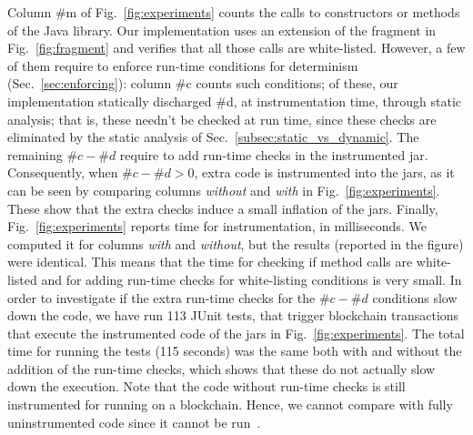 Column \#m of Fig.~\ref{fig:experiments} counts the calls to constructors
or methods of the Java library. Our implementation
uses an extension of the fragment in Fig.~\ref{fig:fragment}
and verifies that all those calls are white-listed.
However, a few of them require to enforce run-time conditions for determinism
(Sec.~\ref{sec:enforcing}): column \#c counts such conditions;
of these, our implementation statically discharged \#d, at instrumentation time,
through static analysis; that is, these needn't
be checked at run time, since these checks are eliminated by the
static analysis of Sec.~\ref{subsec:static_vs_dynamic}. The remaining
$\#c - \#d$ require to add run-time checks in the instrumented jar. Consequently,
when $\#c - \#d > 0$, extra code is instrumented into the jars, as it can be seen by comparing
columns \emph{without} and \emph{with} in Fig.~\ref{fig:experiments}. These
show that the extra checks induce a small inflation of the jars.
Finally, Fig.~\ref{fig:experiments} reports time for instrumentation, in milliseconds.
We computed it for columns \emph{with} and \emph{without}, but the results
(reported in the figure) were identical. This means that the time for
checking if method calls are white-listed and for adding run-time checks for white-listing
conditions is very small.
In order to investigate if the extra run-time checks for the $\#c - \#d$ conditions
slow down the code, we have run 113 JUnit tests, that trigger blockchain transactions
that execute the instrumented code of the jars in Fig.~\ref{fig:experiments}.
The total time for running the
tests (115 seconds) was the same both with and without
the addition of the run-time checks, which shows that
these do not actually slow down the execution. Note that the code without run-time checks
is still instrumented for running on a blockchain. Hence, we cannot compare with fully uninstrumented code
since it cannot be run~\cite{Spoto19}.

